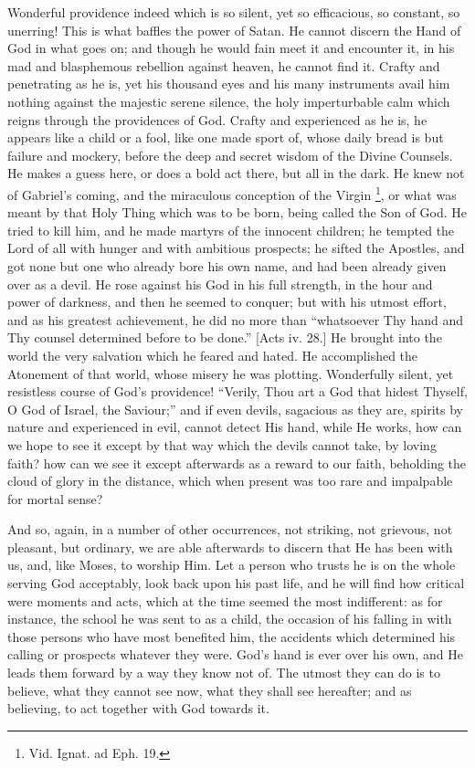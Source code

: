 Wonderful providence indeed which is so silent, yet so efficacious,
so constant, so unerring! This is what baffles the power of Satan. He
cannot discern the Hand of God in what goes on; and though he would
fain meet it and encounter it, in his mad and blasphemous rebellion
against heaven, he cannot find it. Crafty and penetrating as he is,
yet his thousand eyes and his many instruments avail him nothing
against the majestic serene silence, the holy imperturbable calm which
reigns through the providences of God. Crafty and experienced as he
is, he appears like a child or a fool, like one made sport of, whose
daily bread is but failure and mockery, before the deep and secret
wisdom of the Divine Counsels. He makes a guess here, or does a bold
act there, but all in the dark. He knew not of Gabriel's coming, and
the miraculous conception of the Virgin \footnote{Vid. Ignat. ad Eph. 19.},
or what was meant by that Holy Thing which was to be born, being
called the Son of God. He tried to kill him, and he made martyrs of
the innocent children; he tempted the Lord of all with hunger and with
ambitious prospects; he sifted the Apostles, and got none but one who
already bore his own name, and had been already given over as a devil.
He rose against his God in his full strength, in the hour and power of
darkness, and then he seemed to conquer; but with his utmost effort,
and as his greatest achievement, he did no more than ``whatsoever
Thy hand and Thy counsel determined before to be done.'' [Acts iv.
28.] He brought into the world the very salvation which he feared and
hated. He accomplished the Atonement of that world, whose misery he
was plotting. Wonderfully silent, yet resistless course of God's
providence! ``Verily, Thou art a God that hidest Thyself, O God of
Israel, the Saviour;'' and if even devils, sagacious as they are,
spirits by nature and experienced in evil, cannot detect His hand,
while He works, how can we hope to see it except by that way which the
devils cannot take, by loving faith? how can we see it except
afterwards as a reward to our faith, beholding the cloud of glory in
the distance, which when present was too rare and impalpable for
mortal sense?

And so, again, in a number of other occurrences, not striking, not
grievous, not pleasant, but ordinary, we are able afterwards to
discern that He has been with us, and, like Moses, to worship Him. Let
a person who trusts he is on the whole serving God acceptably, look
back upon his past life, and he will find how critical were moments
and acts, which at the time seemed the most indifferent: as for
instance, the school he was sent to as a child, the occasion of his
falling in with those persons who have most benefited him, the
accidents which determined his calling or prospects whatever they
were. God's hand is ever over his own, and He leads them forward by
a way they know not of. The utmost they can do is to believe, what
they cannot see now, what they shall see hereafter; and as believing,
to act together with God towards it.

